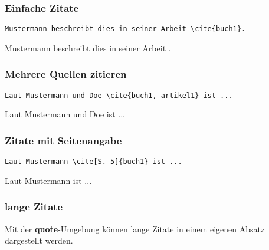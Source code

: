 \subsubsection{Einfache Zitate}

\begin{minipage}[c]{0.48\textwidth}
    \begin{lstlisting}[language={[LaTeX]TeX}]
Mustermann beschreibt dies in seiner Arbeit \cite{buch1}.
    \end{lstlisting}
\end{minipage}
\hfill
\begin{minipage}[c]{0.48\textwidth}
    Mustermann beschreibt dies in seiner Arbeit \cite{buch1}.
\end{minipage}


\subsubsection{Mehrere Quellen zitieren}

\begin{minipage}[c]{0.48\textwidth}
    \begin{lstlisting}[language={[LaTeX]TeX}]
Laut Mustermann und Doe \cite{buch1, artikel1} ist ...
    \end{lstlisting}
\end{minipage}
\hfill
\begin{minipage}[c]{0.48\textwidth}
    Laut Mustermann und Doe \cite{buch1, artikel1} ist ...
\end{minipage}


\subsubsection{Zitate mit Seitenangabe}

\begin{minipage}[c]{0.48\textwidth}
    \begin{lstlisting}[language={[LaTeX]TeX}]
Laut Mustermann \cite[S. 5]{buch1} ist ...
    \end{lstlisting}
\end{minipage}
\hfill
\begin{minipage}[c]{0.48\textwidth}
    Laut Mustermann \cite[S. 5]{buch1} ist ...
\end{minipage}


\subsubsection{lange Zitate}
Mit der \textbf{quote}-Umgebung können lange Zitate in einem eigenen Absatz dargestellt werden.

